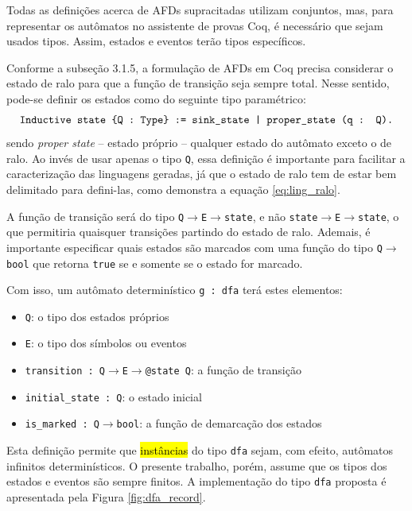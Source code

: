 Todas as definições acerca de AFDs supracitadas utilizam conjuntos, mas, para representar os autômatos no assistente de provas Coq, é necessário que sejam usados tipos. Assim, estados e eventos terão tipos específicos.

Conforme a subseção 3.1.5, a formulação de AFDs em Coq precisa considerar o estado de ralo para que a função de transição seja sempre total. Nesse sentido, pode-se definir os estados como do seguinte tipo paramétrico: $$\text{\texttt{Inductive state \{Q : Type\} := sink\_state | proper\_state (q : Q).}}$$ sendo \textit{proper state} -- estado próprio -- qualquer estado do autômato exceto o de ralo. Ao invés de usar apenas o tipo \texttt{Q}, essa definição é importante para facilitar a caracterização das linguagens geradas, já que o estado de ralo tem de estar bem delimitado para defini-las, como demonstra a equação \ref{eq:ling_ralo}.

A função de transição será do tipo \texttt{Q$\to$E$\to$state}, e não \texttt{state$\to$E$\to$state}, o que permitiria quaisquer transições partindo do estado de ralo. Ademais, é importante especificar quais estados são marcados com uma função do tipo \texttt{Q$\to$bool} que retorna \texttt{true} se e somente se o estado for marcado.

Com isso, um autômato determinístico \texttt{g : dfa} terá estes elementos: \begin{itemize}
	\item \texttt{Q}: o tipo dos estados próprios
	\item \texttt{E}: o tipo dos símbolos ou eventos
	\item  \texttt{transition : Q$\to$E$\to$@state Q}: a função de transição
	\item \texttt{initial\_state : Q}: o estado inicial
	\item \texttt{is\_marked : Q$\to$bool}: a função de demarcação dos estados
\end{itemize}

Esta definição permite que \hl{instâncias} do tipo \texttt{dfa} sejam, com efeito, autômatos infinitos determinísticos. O presente trabalho, porém, assume que os tipos dos estados e eventos são sempre finitos. A implementação do tipo \texttt{dfa} proposta é apresentada pela Figura \ref{fig:dfa_record}.


